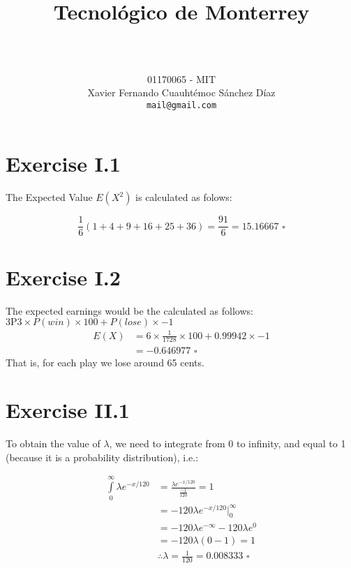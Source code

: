 \documentclass[titlepage, letterpaper]{article}
\title{
\vspace{1in}
\textbf{Tecnológico de Monterrey} \\
\vspace{0.5in}
\textmd{\mahclass} \\
\vspace{0.5in}
\textsc{\mahtitle}
\author{01170065  - MIT \\
Xavier Fernando Cuauhtémoc Sánchez Díaz \\
\texttt{mail@gmail.com}}
\date{\mahdate}
}
\newcommand{\qed}{\,\,\square}
\begin{document}
\begin{titlepage}
    \maketitle
\end{titlepage}

%
%

\section{Exercise I.1} %
\label{sec:exercise_i_1}

The Expected Value $E(X^2)$ is calculated as folows:

$$\dfrac{1}{6}(1 + 4 + 9 + 16 + 25 + 36) = \dfrac{91}{6} = 15.16667 \qed$$


\section{Exercise I.2} %
\label{sec:exercise_i_2}
The expected earnings would be the calculated as follows:
$3 \text{P}3 \times P(win) \times 100 + P(lose) \times -1 $
\begin{align}
    E(X) & = 6 \times \frac{1}{1728} \times 100 + 0.99942 \times -1 \\
    & = -0.646977\qed  
\end{align}
That is, for each play we lose around 65 cents.

\section{Exercise II.1} %
\label{sec:exercise_ii_1}
To obtain the value of $\lambda$, we need to integrate from 0 to infinity, and equal to 1 (because it is a probability distribution), i.e.:

\begin{align}
    \int\limits_0^\infty \lambda e^{-x/120} & = \frac{\lambda e^{-x/120}}{\tfrac{-1}{120}} = 1 \\
    & = -120\lambda e^{-x/120}\Big|_0^\infty \\[3ex]
    & = -120\lambda e^{-\infty} - 120\lambda e^0 \\
    & = -120\lambda (0 - 1) = 1 \\
    & \therefore \lambda = \frac{1}{120} = 0.008333 \qed
\end{align}
\end{document}

